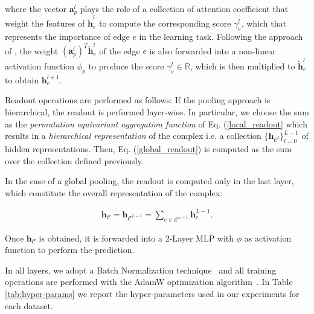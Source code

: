 \documentclass{article}
\begin{document}
where the vector $\mathbf{a}_p^l$ plays the role of a collection of attention coefficient that weight the features of $\tilde{\mathbf{h}}_e^l$  to compute the corresponding score $\gamma_e^l$, which that represents the importance of edge $e$ in the learning task. Following the approach of \cite{lee2019self}, the weight  $( \mathbf{a}_p^l )^T \tilde{\mathbf{h}}_e^l$ of the edge $e$ is also forwarded into a non-linear activation function $\phi_p$ to produce the score $\gamma_e^l \in \mathbb{R}$, which is then multiplied to $\tilde{\mathbf{h}}_e^l$ to obtain $\mathbf{h}_{e}^{l+1}$.

Readout operations are performed as follows: If the pooling approach is hierarchical, the readout is performed layer-wise. In particular, we choose the sum as the \emph{permutation equivariant aggregation function} of Eq. (\ref{local_readout} which results in a \emph{hierarchical representation} of the complex i.e. a collection $\{\mathbf{h}_{\mathcal{C}^l}\}_{l=0}^{L-1}$ of hidden representations. Then, Eq. (\ref{global_readout}) is computed as the sum over the collection defined previously.

In the case of a global pooling, the readout is computed only in the last layer, which constitute  the overall representation of the complex:


\begin{align}
    \mathbf{h}_{\mathcal{C}}= \mathbf{h}_{\mathcal{C}^{L-1}} = \sum_{e \in \mathcal{E}^{L-1}} \mathbf{h}_{e}^{L-1}.
\end{align}


Once $\mathbf{h}_{\mathcal{C}}$ is obtained, it is forwarded into a 2-Layer MLP with $\phi$ as activation function to perform the prediction.

In all layers, we adopt a Batch Normalization technique~\cite{ioffe2015batch} and all training operations are performed with the AdamW optimization algorithm~\cite{loshchilov2017decoupled}. In Table \ref{tab:hyper-params} we report the hyper-parameters used in our experiments for each dataset.
\end{document}
